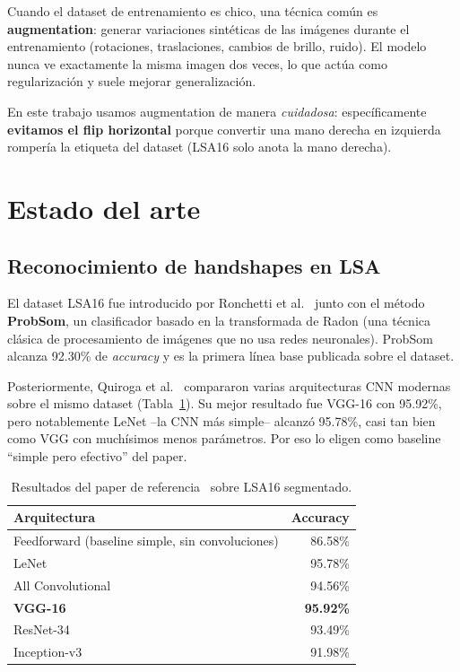 \documentclass[a4paper,11pt]{article}
\begin{document}
Cuando el dataset de entrenamiento es chico, una técnica común es \textbf{augmentation}: generar variaciones sintéticas de las imágenes durante el entrenamiento (rotaciones, traslaciones, cambios de brillo, ruido). El modelo nunca ve exactamente la misma imagen dos veces, lo que actúa como regularización y suele mejorar generalización.

En este trabajo usamos augmentation de manera \emph{cuidadosa}: específicamente \textbf{evitamos el flip horizontal} porque convertir una mano derecha en izquierda rompería la etiqueta del dataset (LSA16 solo anota la mano derecha).

\section{Estado del arte}
\label{sec:soa}

\subsection{Reconocimiento de handshapes en LSA}

El dataset LSA16 fue introducido por Ronchetti et al.~\cite{ronchetti2016probsom} junto con el método \textbf{ProbSom}, un clasificador basado en la transformada de Radon (una técnica clásica de procesamiento de imágenes que no usa redes neuronales). ProbSom alcanza 92.30\% de \textit{accuracy} y es la primera línea base publicada sobre el dataset.

Posteriormente, Quiroga et al.~\cite{quiroga2017study} compararon varias arquitecturas CNN modernas sobre el mismo dataset (Tabla~\ref{tab:paper-baseline}). Su mejor resultado fue VGG-16 con 95.92\%, pero notablemente LeNet --la CNN más simple-- alcanzó 95.78\%, casi tan bien como VGG con muchísimos menos parámetros. Por eso lo eligen como baseline ``simple pero efectivo'' del paper.

\begin{table}[h]
\centering
\caption{Resultados del paper de referencia~\cite{quiroga2017study} sobre LSA16 segmentado.}
\label{tab:paper-baseline}
\begin{tabular}{lr}
\toprule
\textbf{Arquitectura} & \textbf{Accuracy} \\
\midrule
Feedforward (baseline simple, sin convoluciones) & 86.58\% \\
LeNet~\cite{lecun1998gradient} & 95.78\% \\
All Convolutional~\cite{springenberg2014striving} & 94.56\% \\
\textbf{VGG-16~\cite{simonyan2014very}} & \textbf{95.92\%} \\
ResNet-34~\cite{he2016deep} & 93.49\% \\
Inception-v3~\cite{szegedy2016rethinking} & 91.98\% \\
\bottomrule
\end{tabular}
\end{table}
\end{document}
